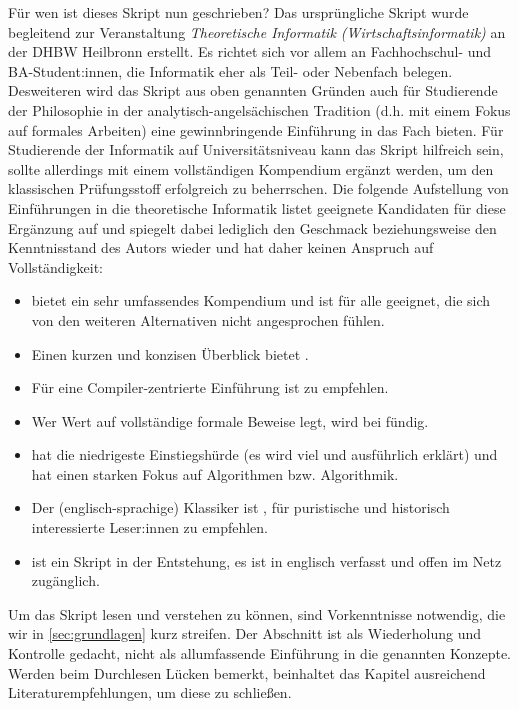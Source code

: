 Für wen ist dieses Skript nun geschrieben?
Das ursprüngliche Skript wurde begleitend zur Veranstaltung
\emph{Theoretische Informatik (Wirtschaftsinformatik)}
an der DHBW Heilbronn erstellt.
Es richtet sich vor allem an Fachhochschul- und BA-Student:innen,
die Informatik eher als Teil- oder Nebenfach belegen.
Desweiteren wird das Skript aus oben genannten Gründen auch für Studierende der Philosophie
in der analytisch-angelsächischen Tradition (d.h. mit einem Fokus auf formales Arbeiten)
eine gewinnbringende Einführung in das Fach bieten.
Für Studierende der Informatik auf Universitätsniveau kann das Skript
hilfreich sein,
sollte allerdings mit einem vollständigen Kompendium ergänzt werden,
um den klassischen Prüfungsstoff erfolgreich zu beherrschen.
Die folgende Aufstellung von Einführungen in die theoretische Informatik
listet geeignete Kandidaten für diese Ergänzung auf
und spiegelt dabei lediglich den Geschmack beziehungsweise den Kenntnisstand des Autors wieder
und hat daher keinen Anspruch auf Vollständigkeit:
\begin{itemize}
    \item  \cite{hoffmann} bietet ein sehr umfassendes Kompendium
            und ist für alle geeignet, die sich von den weiteren Alternativen nicht angesprochen fühlen.
    \item  Einen kurzen und konzisen Überblick bietet \cite{schoening}.
    \item  Für eine Compiler-zentrierte Einführung ist \cite{hedtstueck}
           zu empfehlen.
    \item  Wer Wert auf vollständige formale Beweise legt,
           wird bei \cite{erkpriese} fündig.
    \item  \cite{neubert} hat die niedrigeste Einstiegshürde (es wird viel und ausführlich erklärt)
           und hat einen starken Fokus auf Algorithmen bzw. Algorithmik.
    \item  Der (englisch-sprachige) Klassiker ist \cite{hopcroftullman},
           für puristische und historisch interessierte Leser:innen zu empfehlen.
    \item  \cite{barak} ist ein Skript in der Entstehung,
           es ist in englisch verfasst und offen im Netz zugänglich.
\end{itemize}

Um das Skript lesen und verstehen zu können,
sind Vorkenntnisse notwendig,
die wir in \autoref{sec:grundlagen} kurz streifen.
Der Abschnitt ist als Wiederholung und Kontrolle gedacht,
nicht als allumfassende Einführung in die genannten Konzepte.
Werden beim Durchlesen Lücken bemerkt,
beinhaltet das Kapitel ausreichend Literaturempfehlungen,
um diese zu schließen.

